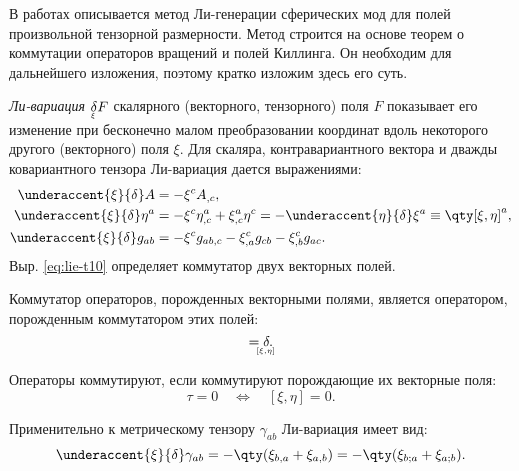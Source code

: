 \documentclass[\docroot/reports/draft/report.tex]{subfiles}
\begin{document}
    В работах \cite{burlankov_tmf,burlankov_grav_waves} описывается метод Ли-генерации сферических мод для полей произвольной тензорной размерности. Метод строится на основе теорем о коммутации операторов вращений и полей Киллинга. Он необходим для дальнейшего изложения, поэтому кратко изложим здесь его суть.

    \textit{Ли-вариация} $\underaccent{\xi}{\delta} F$ скалярного (векторного, тензорного) поля $F$ показывает его изменение при бесконечно малом преобразовании координат вдоль некоторого другого (векторного) поля $\xi$. Для скаляра, контравариантного вектора и дважды ковариантного тензора Ли-вариация дается выражениями:
    \begin{align}\label{eq:lie-t00}
        \underaccent{\xi}{\delta} A &= - \xi^c A_{,c}, \\
        \label{eq:lie-t10}
        \underaccent{\xi}{\delta} \eta^a &=
            - \xi^c \eta^{a}_{,c} + \xi^a_{,c} \eta^c =
                - \underaccent{\eta}{\delta} \xi^a \equiv \qty[\xi,\eta]^a, \\
        \label{eq:lie-t02}
        \underaccent{\xi}{\delta} g_{ab} &=
            - \xi^c g_{ab,c} - \xi^c_{,a} g_{cb} - \xi^c_{,b} g_{ac}.
    \end{align}
    Выр. \ref{eq:lie-t10} определяет коммутатор двух векторных полей.
    \begin{theorem}
        Коммутатор операторов, порожденных векторными полями, является оператором, порожденным коммутатором этих полей:
        \begin{equation*}
            [\underaccent{\xi}{\delta},\underaccent{\eta}{\delta}] =
                \underaccent{[\xi,\eta]}{\delta}.
        \end{equation*}
    \end{theorem}
    \begin{theorem}
        Операторы коммутируют, если коммутируют порождающие их векторные поля:
        \begin{equation*}
            [\underaccent{\xi}{\delta},\underaccent{\eta}{\delta}]\tau = 0
                \quad\Leftrightarrow\quad
            [\xi,\eta] = 0 .
        \end{equation*}
    \end{theorem}

    Применительно к метрическому тензору $\gamma_{ab}$ Ли-вариация имеет вид:
    \begin{equation}\label{eq:lie-tm}
        \underaccent{\xi}{\delta} \gamma_{ab}
            = - \qty(\xi_{b,a} + \xi_{a,b})
            = - \qty(\xi_{b;a} + \xi_{a;b}).
    \end{equation}
\end{document}
